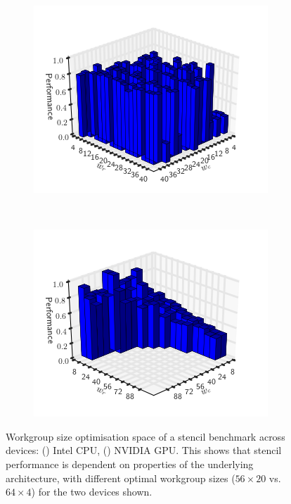 \documentclass[nonatbib,preprint,9pt]{sigplanconf}
\begin{document}
\begin{figure}
\centering
\begin{subfigure}[h]{.45\columnwidth}
\centering
\includegraphics[width=1.0\columnwidth]{img/motivation_1}
\vspace{-1.5em} %
\caption{}
\label{fig:motivation-1}
\end{subfigure}
~%
\begin{subfigure}[h]{.45\columnwidth}
\centering
\includegraphics[width=1.0\columnwidth]{img/motivation_2}
\vspace{-1.5em} %
\caption{}
\label{fig:motivation-2}
\end{subfigure}
\caption[Workgroup size optimisation space across devices]{%
  Workgroup size optimisation space of a stencil benchmark across
  devices: () Intel CPU,
  () NVIDIA GPU. This shows that stencil
  performance is dependent on properties of the underlying
  architecture, with different optimal workgroup sizes ($56 \times 20$
  vs.\ $64 \times 4$) for the two devices shown.%
}
\label{fig:motivation-arch}
\end{figure}
\end{document}
